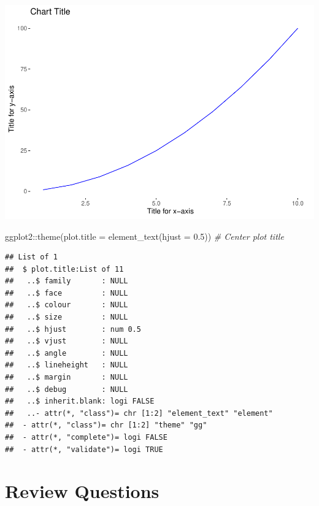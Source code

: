 \documentclass[
]{book}
\newenvironment{Shaded}{\begin{snugshade}}{\end{snugshade}}
\newcommand{\AttributeTok}[1]{\textcolor[rgb]{0.77,0.63,0.00}{#1}}
\newcommand{\CommentTok}[1]{\textcolor[rgb]{0.56,0.35,0.01}{\textit{#1}}}
\newcommand{\FloatTok}[1]{\textcolor[rgb]{0.00,0.00,0.81}{#1}}
\newcommand{\FunctionTok}[1]{\textcolor[rgb]{0.00,0.00,0.00}{#1}}
\newcommand{\NormalTok}[1]{#1}
\newcommand{\SpecialCharTok}[1]{\textcolor[rgb]{0.00,0.00,0.00}{#1}}
\begin{document}
\includegraphics{The_Fundamentals_of_People_Analytics_files/figure-latex/unnamed-chunk-52-1.pdf}

\begin{Shaded}
\begin{Highlighting}[]
\NormalTok{ggplot2}\SpecialCharTok{::}\FunctionTok{theme}\NormalTok{(}\AttributeTok{plot.title =} \FunctionTok{element\_text}\NormalTok{(}\AttributeTok{hjust =} \FloatTok{0.5}\NormalTok{)) }\CommentTok{\# Center plot title}
\end{Highlighting}
\end{Shaded}

\begin{verbatim}
## List of 1
##  $ plot.title:List of 11
##   ..$ family       : NULL
##   ..$ face         : NULL
##   ..$ colour       : NULL
##   ..$ size         : NULL
##   ..$ hjust        : num 0.5
##   ..$ vjust        : NULL
##   ..$ angle        : NULL
##   ..$ lineheight   : NULL
##   ..$ margin       : NULL
##   ..$ debug        : NULL
##   ..$ inherit.blank: logi FALSE
##   ..- attr(*, "class")= chr [1:2] "element_text" "element"
##  - attr(*, "class")= chr [1:2] "theme" "gg"
##  - attr(*, "complete")= logi FALSE
##  - attr(*, "validate")= logi TRUE
\end{verbatim}

\hypertarget{review-questions}{%
\section{Review Questions}\label{review-questions}}
\end{document}

